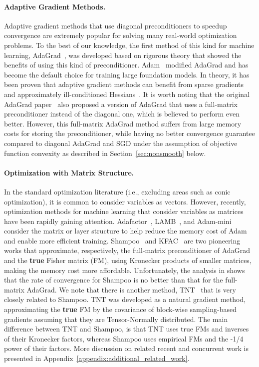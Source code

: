 \documentclass{article}
\theoremstyle{remark}
\begin{document}
\paragraph{Adaptive Gradient Methods.} Adaptive gradient methods that use diagonal preconditioners to speedup 
convergence are extremely popular for solving many real-world optimization problems. {To the best of our knowledge,} the first method of this kind {for machine learning,} AdaGrad~\citep{duchi2011adaptive,streeter2010less}, was developed based on rigorous theory that showed the benefits of using this kind of preconditioner. Adam~\citep{kingma2014adam,loshchilov2017decoupled} modified AdaGrad and has become the default choice for training large foundation models. In theory, it has been proven that adaptive gradient methods can benefit from sparse gradients and approximately ill-conditioned Hessians~\citep{duchi2011adaptive,liu2024adagrad,jiang2024convergence,xie2024adam}. It is worth noting that the original AdaGrad paper~\citep{duchi2011adaptive} also proposed a version of AdaGrad that uses a full-matrix preconditioner instead of the diagonal one, which is believed to perform even better. However, this full-matrix AdaGrad method suffers from large memory costs for storing the preconditioner, 
while having 
no better convergence guarantee compared to diagonal AdaGrad and SGD under 
the assumption of objective function convexity
as described 
in Section~\ref{sec:nonsmooth} 
below.

\paragraph{Optimization with Matrix Structure.} In the standard optimization literature (i.e., excluding areas such as conic optimization), it is common to consider variables as vectors. However, recently, optimization methods for machine learning that consider variables as matrices have been rapidly gaining attention. Adafactor~\citep{shazeer2018adafactor}, LAMB~\citep{you2019large}, and Adam-mini~\citep{zhang2024adam} consider the matrix or layer structure to help reduce the memory cost of Adam and enable more efficient training. Shampoo~\citep{gupta2018shampoo} and KFAC~\citep{martens2015optimizing} are two pioneering works that approximate, {respectively, the full-matrix preconditioner of AdaGrad and the \textbf{true} Fisher matrix (FM), using Kronecker products of smaller matrices, making the memory cost more affordable. } Unfortunately, the analysis in \citep{gupta2018shampoo} shows that the rate of convergence for Shampoo is no better than that for the full-matrix AdaGrad. {We note that there is another method, TNT~\citep{ren2021tensornormaltrainingdeep} that is very closely related to Shampoo. TNT was developed as a natural gradient method, approximating the \textbf{true} FM by the covariance of block-wise sampling-based gradients assuming that they are Tensor-Normally distributed. The main difference between TNT and Shampoo, is that TNT uses true FMs and inverses of their Kronecker factors, whereas Shampoo uses empirical FMs and the -1/4 power of their factors.} {More discussion on 
related
recent and concurrent work is presented in Appendix~\ref{appendix:additional_related_work}.}
\end{document}
